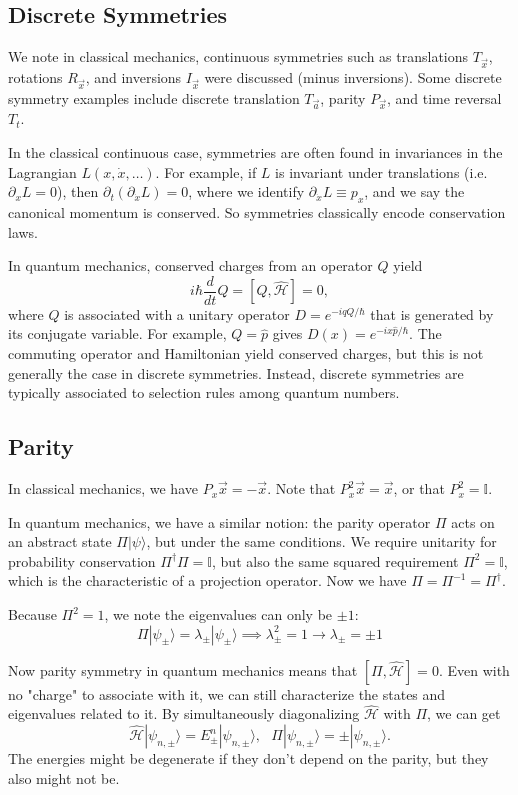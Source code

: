 \documentclass[fontsize=12pt]{scrartcl}
\newcommand{\bb}[1]{\mathbb{#1}}
\newcommand{\Id}{\bb{I}}
\newcommand{\ptl}{\partial}
\newcommand{\ra}{\rangle}
\newcommand{\mom}{\hat{p}}
\newcommand{\Ham}{\hat{\mathcal{H}}}
\begin{document}
\subsection{Discrete Symmetries}
We note in classical mechanics, continuous symmetries such as translations $T_{\vec{x}}$, rotations $R_{\vec{x}}$, and inversions $I_{\vec{x}}$ were discussed (minus inversions). Some discrete symmetry examples include discrete translation $T_{\vec{a}}$, parity $P_{\vec{x}}$, and time reversal $T_t$.

In the classical continuous case, symmetries are often found in invariances in the Lagrangian $L(x,\dot{x},\dots)$. For example, if $L$ is invariant under translations (i.e. $\ptl_x L=0$), then $\ptl_t(\ptl_{\dot{x}}L)=0$, where we identify $\ptl_{\dot{x}}L\equiv p_x$, and we say the canonical momentum is conserved. So symmetries classically encode conservation laws.

In quantum mechanics, conserved charges from an operator $Q$ yield $$i\hbar \frac{d}{dt}Q=[Q,\Ham]=0,$$ where $Q$ is associated with a unitary operator $D=e^{-iqQ/\hbar}$ that is generated by its conjugate variable. For example, $Q=\mom$ gives $D(x)=e^{-ix\mom/\hbar}$. The commuting operator and Hamiltonian yield conserved charges, but this is not generally the case in discrete symmetries. Instead, discrete symmetries are typically associated to selection rules among quantum numbers.

\subsection{Parity}

In classical mechanics, we have $P_x\vec{x}=-\vec{x}$. Note that $P_x^2\vec{x}=\vec{x}$, or that $P_x^2=\Id$.

In quantum mechanics, we have a similar notion: the parity operator $\Pi$ acts on an abstract state $\Pi|\psi\ra$, but under the same conditions. We require unitarity for probability conservation $\Pi^\dagger\Pi=\Id$, but also the same squared requirement $\Pi^2=\Id$, which is the characteristic of a projection operator. Now we have $\Pi=\Pi^{-1}=\Pi^\dagger$.

Because $\Pi^2=1$, we note the eigenvalues can only be $\pm 1$: $$\Pi|\psi_\pm\ra = \lambda_\pm|\psi_\pm\ra\implies \lambda^2_\pm=1\to \lambda_\pm = \pm 1$$

Now parity symmetry in quantum mechanics means that $[\Pi,\Ham]=0$. Even with no "charge" to associate with it, we can still characterize the states and eigenvalues related to it. By simultaneously diagonalizing $\Ham$ with $\Pi$, we can get $$\Ham|\psi_{n,\pm}\ra = E^n_\pm|\psi_{n,\pm}\ra, \ \ \ \Pi|\psi_{n,\pm}\ra = \pm |\psi_{n,\pm}\ra.$$ The energies might be degenerate if they don't depend on the parity, but they also might not be.
\end{document}
